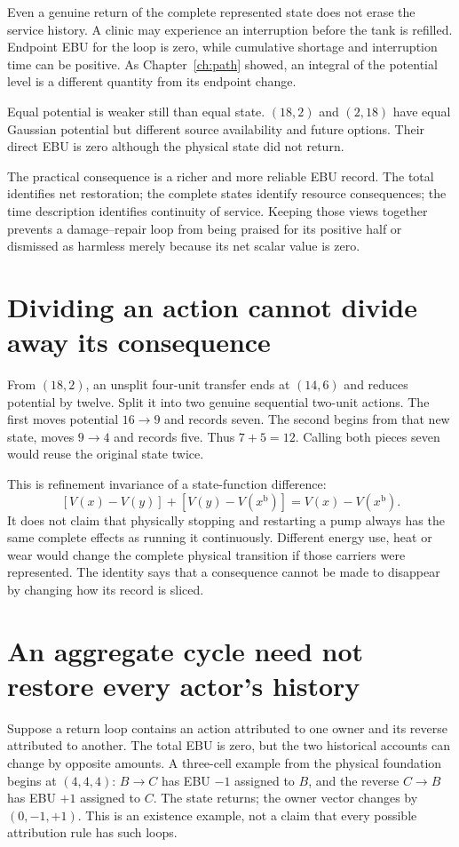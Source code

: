 Even a genuine return of the complete represented state does not erase the service history. A clinic may experience an interruption before the tank is refilled. Endpoint EBU for the loop is zero, while cumulative shortage and interruption time can be positive. As Chapter~\ref{ch:path} showed, an integral of the potential level is a different quantity from its endpoint change.

Equal potential is weaker still than equal state. $(18,2)$ and $(2,18)$ have equal Gaussian potential but different source availability and future options. Their direct EBU is zero although the physical state did not return.

The practical consequence is a richer and more reliable EBU record. The total identifies net restoration; the complete states identify resource consequences; the time description identifies continuity of service. Keeping those views together prevents a damage--repair loop from being praised for its positive half or dismissed as harmless merely because its net scalar value is zero.

\section{Dividing an action cannot divide away its consequence}
From $(18,2)$, an unsplit four-unit transfer ends at $(14,6)$ and reduces
potential by twelve. Split it into two genuine sequential two-unit actions.
The first moves potential $16\to9$ and records seven. The second begins from
that new state, moves $9\to4$ and records five. Thus $7+5=12$. Calling both
pieces seven would reuse the original state twice.

This is refinement invariance of a state-function difference:
\[
 [V(x)-V(y)]+[V(y)-V(x^{\mathrm{b}})]=V(x)-V(x^{\mathrm{b}}).
\]
It does not claim that physically stopping and restarting a pump always has
the same complete effects as running it continuously. Different energy use,
heat or wear would change the complete physical transition if those carriers
were represented. The identity says that a consequence cannot be made to
disappear by changing how its record is sliced.

\section{An aggregate cycle need not restore every actor's history}
Suppose a return loop contains an action attributed to one owner and its
reverse attributed to another. The total EBU is zero, but the two historical
accounts can change by opposite amounts. A three-cell example from the
physical foundation begins at $(4,4,4)$: $B\to C$ has EBU $-1$ assigned to
$B$, and the reverse $C\to B$ has EBU $+1$ assigned to $C$. The state
returns; the owner vector changes by $(0,-1,+1)$. This is an existence
example, not a claim that every possible attribution rule has such loops.

